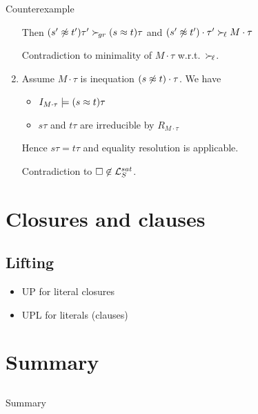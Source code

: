 \documentclass[%
handout,
]{beamer}
\begin{document}
\begin{frame}[allowframebreaks]{Counterexample}
\begin{enumerate}
        Then $(s'\not\approx t')\tau'\mathrel\succ_{\!gr} (s\approx t)\tau$ and $(s'\not\approx t')\cdot\tau'\mathrel\succ_{\!\ell} M\cdot\tau$

        Contradiction to minimality of $M\cdot\tau$ w.r.t.~$\mathrel\succ_{\!\ell}$.
        \vspace{0.5em}

        \item Assume $M\cdot\tau$ is inequation $(s\not\approx t)\cdot\tau$. We have
        \begin{itemize}
            \item $I_{M\cdot\tau}\models (s\approx t)\tau$
            \item $s\tau$ and $t\tau$ are irreducible by $R_{M\cdot\tau}$
        \end{itemize}
        Hence $s\tau = t\tau$ and equality resolution is applicable.

        Contradiction to $\square\not\in\mathcal{L}_S^{sat}$.
    \end{enumerate}

\end{frame}

\section{Closures and clauses}
\subsection{Lifting}
\begin{frame}
    \begin{itemize}
        \item UP for literal closures
        \vspace{-1.4em}
            
            \vspace{-2.1em}
            

        \vspace{0.7em}

    \item UPL for literals (clauses)
    \vspace{-1.4em}
    
    \vspace{-2.1em}
    
\end{itemize}


\end{frame}

\section{Summary}
\subsection{}
\begin{frame}{Summary}

\end{frame}
\end{document}
